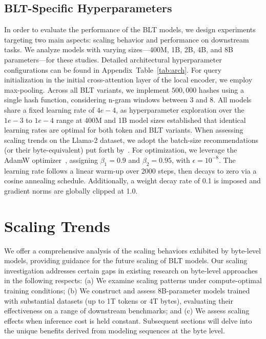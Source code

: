 \subsection{{\textsc BLT}-Specific Hyperparameters} In order to evaluate the performance of the {\textsc BLT} models, we design experiments targeting two main aspects: scaling behavior and performance on downstream tasks. We analyze models with varying sizes—400M, 1B, 2B, 4B, and 8B parameters—for these studies. Detailed architectural hyperparameter configurations can be found in Appendix~Table~\ref{tab:arch}.  
For query initialization in the initial cross-attention layer of the local encoder, we employ max-pooling. Across all {\textsc BLT} variants, we implement $500,000$ hashes using a single hash function, considering n-gram windows between 3 and 8. All models share a fixed learning rate of $4e-4$, as hyperparameter exploration over the $1e-3$ to $1e-4$ range at 400M and 1B model sizes established that identical learning rates are optimal for both token and {\textsc BLT} variants. When assessing scaling trends on the Llama-2 dataset, we adopt the batch-size recommendations (or their byte-equivalent) put forth by~\cite{dubey2024llama}. For optimization, we leverage the AdamW optimizer~\citep{adamw}, assigning $\beta_1=0.9$ and $\beta_2=0.95$, with $\epsilon=10^{-8}$. The learning rate follows a linear warm-up over 2000 steps, then decays to zero via a cosine annealing schedule. Additionally, a weight decay rate of 0.1 is imposed and gradient norms are globally clipped at 1.0.

\section{Scaling Trends}
\label{section:scaling}

We offer a comprehensive analysis of the scaling behaviors exhibited by byte-level models, providing guidance for the future scaling of {\textsc BLT} models. Our scaling investigation addresses certain gaps in existing research on byte-level approaches in the following respects: (a) We examine scaling patterns under compute-optimal training conditions; (b) We construct and assess 8B-parameter models trained with substantial datasets (up to 1T tokens or 4T bytes), evaluating their effectiveness on a range of downstream benchmarks; and (c) We assess scaling effects when inference cost is held constant. Subsequent sections will delve into the unique benefits derived from modeling sequences at the byte level.

